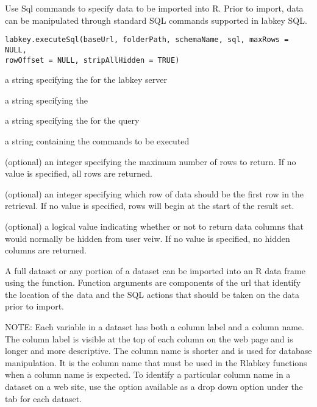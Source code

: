 \begin{Description}\relax
Use Sql commands to specify data to be imported into R. Prior to import, data can
be manipulated through standard SQL commands supported in labkey SQL.
\end{Description}
\begin{Usage}
\begin{verbatim}
labkey.executeSql(baseUrl, folderPath, schemaName, sql, maxRows = NULL, 
rowOffset = NULL, stripAllHidden = TRUE)
\end{verbatim}
\end{Usage}
\begin{Arguments}
\begin{ldescription}
\item[\code{baseUrl}] a string specifying the for the labkey server
\item[\code{folderPath}] a string specifying the  
\item[\code{schemaName}] a string specifying the   for the query
\item[\code{sql}] a string containing the  commands to be executed
\item[\code{maxRows}] (optional) an integer specifying the maximum number of rows to return. If no value is specified, all rows are returned.
\item[\code{rowOffset}] (optional) an integer specifying which row of data should be the first row in the retrieval. 
If no value is specified, rows will begin at the start of the result set.
\item[\code{stripAllHidden}] (optional) a logical value indicating whether or not to return data columns that would 
normally be hidden from user veiw. If no value is specified, no hidden columns are returned.
\end{ldescription}
\end{Arguments}
\begin{Details}\relax
A full dataset or any portion of a dataset can be imported into an R
data frame using the 
function. Function arguments are components of the url that identify the location of the
data and the SQL actions that should be taken on the data prior to import.


NOTE: Each variable in a dataset has both a column label and a column name. The column label is visible at the top
of each column on the web page and is longer and more descriptive. The column name is shorter and is
used  for database manipulation. It is the column name that must be used in
the Rlabkey functions when a column name is expected. To identify a particular column name in a dataset on
a web site, use the  option available as a drop down option under the 
tab for each dataset.
\end{Details}
